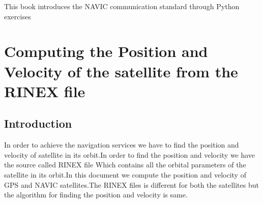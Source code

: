 \documentclass[10pt]{book}
\begin{document}

\setcounter{page}{1}

\begin{introduction}
This book introduces the NAVIC communication standard through Python exercises

\end{introduction}

\mainmatter

\chapter{Computing the Position and Velocity of the satellite from the RINEX file}
\section{Introduction}
In order to achieve the navigation services we have to find the position and velocity of satellite in its orbit.In order to find the position and velocity we have the source called RINEX file Which contains all the orbital parameters of the satellite in its orbit.In this document we  compute the position and velocity of GPS and NAVIC satellites.The RINEX files is different for both the satellites but the algorithm for finding the position and velocity is same.
\end{document}
